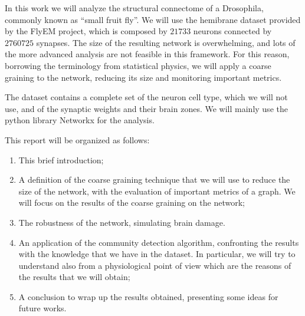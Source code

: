 In this work we will analyze the structural connectome of a Drosophila, commonly known as 
“small fruit fly”. We will use the hemibrane dataset provided by the FlyEM project\cite{xu2020connectome}, which is composed by $21733$ neurons connected by $2760725$ synapses. The size
of the resulting network is overwhelming, and lots of the more advanced analysis are 
not feasible in this framework. For this reason, borrowing the terminology from statistical
physics, we will apply a coarse graining to the network, reducing its size and monitoring
important metrics. 

The dataset contains a complete set of the neuron cell type, which we will
not use, and of the synaptic weights and their brain zones. We will mainly use
the python library Networkx\cite{hagberg2008exploring} for the analysis.


This report will be organized as follows:
\begin{enumerate}
    \item This brief introduction;
    \item A definition of the coarse graining technique that we will use to reduce the size 
        of the network, with the evaluation of important metrics of a graph. We will 
        focus on the results of the coarse graining on the network;
    \item The robustness of the network, simulating brain damage. 
    \item An application of the community detection algorithm, confronting the results
        with the knowledge that we have in the dataset. In particular, we will try to understand
        also from a physiological point of view which are the reasons of the results
        that we will obtain;
    \item A conclusion to wrap up the results obtained, presenting some 
        ideas for future works.
\end{enumerate}
